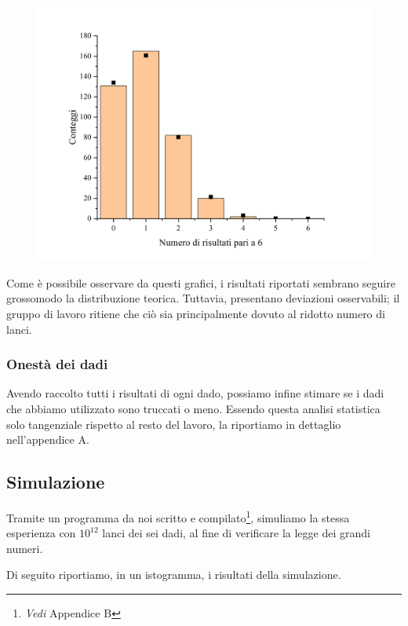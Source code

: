 \documentclass{article}
\begin{document}
\begin{center}
\begin{figure}[H]
        \includegraphics[trim={2cm .5cm 2.4cm 2.1cm},clip,width=.5\textwidth]{img/Dadi6.jpg}
    \end{figure}
\end{center}

Come è possibile osservare da questi grafici, i risultati riportati sembrano seguire
grossomodo la distribuzione teorica. Tuttavia, presentano deviazioni osservabili; il
gruppo di lavoro ritiene che ciò sia principalmente dovuto al ridotto numero di lanci.

\subsubsection*{Onestà dei dadi}
Avendo raccolto tutti i risultati di ogni dado, possiamo infine stimare se i dadi che
abbiamo utilizzato sono truccati o meno. Essendo questa analisi statistica solo
tangenziale rispetto al resto del lavoro, la riportiamo in dettaglio nell'appendice A.

\subsection{Simulazione}
Tramite un programma da noi scritto e compilato\footnote{\emph{Vedi} Appendice B},
simuliamo la stessa esperienza con $10^{12}$ lanci dei sei dadi, al fine di
verificare la legge dei grandi numeri.

Di seguito riportiamo, in un istogramma, i risultati della simulazione.
\end{document}
